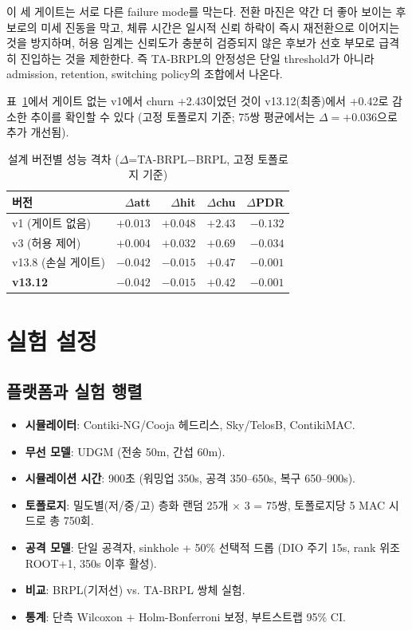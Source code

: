 \documentclass[10pt,a4paper,twocolumn]{article}
\begin{document}
이 세 게이트는 서로 다른 failure mode를 막는다.
전환 마진은 약간 더 좋아 보이는 후보로의 미세 진동을 막고,
체류 시간은 일시적 신뢰 하락이 즉시 재전환으로 이어지는 것을 방지하며,
허용 임계는 신뢰도가 충분히 검증되지 않은 후보가
선호 부모로 급격히 진입하는 것을 제한한다.
즉 TA-BRPL의 안정성은 단일 threshold가 아니라
admission, retention, switching policy의 조합에서 나온다.

표~\ref{tab:versions}에서 게이트 없는 v1에서 churn +2.43이었던 것이
v13.12(최종)에서 +0.42로 감소한 추이를 확인할 수 있다
(고정 토폴로지 기준; 75쌍 평균에서는 $\Delta=+0.036$으로 추가 개선됨).

\begin{table}[!tbp]
\centering\small
\caption{설계 버전별 성능 격차 ($\Delta$=TA-BRPL$-$BRPL, 고정 토폴로지 기준)}
\label{tab:versions}
\begin{tabular}{lrrrr}
\toprule
버전 & $\Delta$att & $\Delta$hit & $\Delta$chu & $\Delta$PDR \\
\midrule
v1 (게이트 없음)    & $+0.013$ & $+0.048$ & $+2.43$ & $-0.132$ \\
v3 (허용 제어)      & $+0.004$ & $+0.032$ & $+0.69$ & $-0.034$ \\
v13.8 (손실 게이트) & $-0.042$ & $-0.015$ & $+0.47$ & $-0.001$ \\
\textbf{v13.12}     & $\mathbf{-0.042}$ & $\mathbf{-0.015}$
                    & $\mathbf{+0.42}$ & $\mathbf{-0.001}$ \\
\bottomrule
\end{tabular}
\end{table}


\section{실험 설정}
\label{sec:setup}

\subsection{플랫폼과 실험 행렬}

\begin{itemize}\setlength{\itemsep}{1pt}
  \item \textbf{시뮬레이터}: Contiki-NG/Cooja 헤드리스, Sky/TelosB, ContikiMAC.
  \item \textbf{무선 모델}: UDGM (전송 50m, 간섭 60m).
  \item \textbf{시뮬레이션 시간}: 900초 (워밍업 350s, 공격 350--650s, 복구 650--900s).
  \item \textbf{토폴로지}: 밀도별(저/중/고) 층화 랜덤 25개 $\times$ 3 = 75쌍, 토폴로지당 5 MAC 시드로 총 750회.
  \item \textbf{공격 모델}: 단일 공격자, sinkhole + 50\% 선택적 드롭
    (DIO 주기 15s, rank 위조 ROOT+1, 350s 이후 활성).
  \item \textbf{비교}: BRPL(기저선) vs. TA-BRPL 쌍체 실험.
  \item \textbf{통계}: 단측 Wilcoxon + Holm-Bonferroni 보정, 부트스트랩 95\% CI.
\end{itemize}
\end{document}
